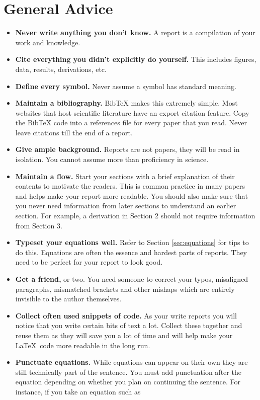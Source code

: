 \documentclass[english,10pt,a4paper, openany, oneside]{book}
\begin{document}
	\section{General Advice}
	\begin{itemize}
		\item \textbf{Never write anything you don't know.} A report is a compilation of your work and knowledge. 
		\item \textbf{Cite everything you didn't explicitly do yourself.} This includes figures, data, results, derivations, etc.
		\item \textbf{Define every symbol.} Never assume a symbol has standard meaning. 
		\item \textbf{Maintain a bibliography.} BibTeX makes this extremely simple. Most websites that host scientific literature have an export citation feature. Copy the BibTeX code into a references file for every paper that you read. Never leave citations till the end of a report. 
		\item \textbf{Give ample background.} Reports are not papers, they will be read in isolation. You cannot assume more than proficiency in science.
		\item \textbf{Maintain a flow.} Start your sections with a brief explanation of their contents to motivate the readers. This is common practice in many papers and helps make your report more readable. You should also make sure that you never need information from later sections to understand an earlier section. For example, a derivation in Section 2 should not require information from Section 3.
		\item \textbf{Typeset your equations well.} Refer to Section \ref{sec:equations} for tips to do this. Equations are often the essence and hardest parts of reports. They need to be perfect for your report to look good.
		\item \textbf{Get a friend,} or two. You need someone to correct your typos, misaligned paragraphs, mismatched brackets and other mishaps which are entirely invisible to the author themselves.
		\item \textbf{Collect often used snippets of code.} As your write reports you will notice that you write certain bits of text a lot. Collect these together and reuse them as they will save you a lot of time and will help make your \LaTeX\ code more readable in the long run.
		\item \textbf{Punctuate equations.}
		While equations can appear on their own they are still technically part of the sentence. You must add punctuation after the equation depending on whether you plan on continuing the sentence. For instance, if you take an equation such as

\end{itemize}
\end{document}
